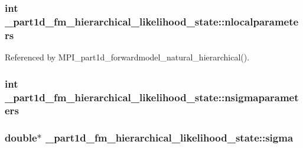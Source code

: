 \subsubsection[{\texorpdfstring{nlocalparameters}{nlocalparameters}}]{\setlength{\rightskip}{0pt plus 5cm}int \+\_\+part1d\+\_\+fm\+\_\+hierarchical\+\_\+likelihood\+\_\+state\+::nlocalparameters}\hypertarget{struct__part1d__fm__hierarchical__likelihood__state_a7506e3fdcf51f3c06da9d0f7334b20ec}{}\label{struct__part1d__fm__hierarchical__likelihood__state_a7506e3fdcf51f3c06da9d0f7334b20ec}


Referenced by M\+P\+I\+\_\+part1d\+\_\+forwardmodel\+\_\+natural\+\_\+hierarchical().

\subsubsection[{\texorpdfstring{nsigmaparameters}{nsigmaparameters}}]{\setlength{\rightskip}{0pt plus 5cm}int \+\_\+part1d\+\_\+fm\+\_\+hierarchical\+\_\+likelihood\+\_\+state\+::nsigmaparameters}\hypertarget{struct__part1d__fm__hierarchical__likelihood__state_a0ae7566f0efad77db75a32b5de663d28}{}\label{struct__part1d__fm__hierarchical__likelihood__state_a0ae7566f0efad77db75a32b5de663d28}
\subsubsection[{\texorpdfstring{sigma}{sigma}}]{\setlength{\rightskip}{0pt plus 5cm}double$\ast$ \+\_\+part1d\+\_\+fm\+\_\+hierarchical\+\_\+likelihood\+\_\+state\+::sigma}\hypertarget{struct__part1d__fm__hierarchical__likelihood__state_ad154bb322c0f848f02cba9712535c7b8}{}\label{struct__part1d__fm__hierarchical__likelihood__state_ad154bb322c0f848f02cba9712535c7b8}
